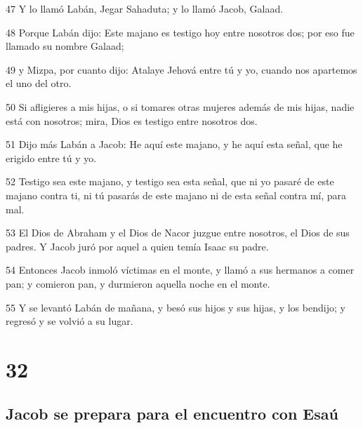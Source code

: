 \par 47 Y lo llamó Labán, Jegar Sahaduta; y lo llamó Jacob, Galaad.
\par 48 Porque Labán dijo: Este majano es testigo hoy entre nosotros dos; por eso fue llamado su nombre Galaad;
\par 49 y Mizpa, por cuanto dijo: Atalaye Jehová entre tú y yo, cuando nos apartemos el uno del otro.
\par 50 Si afligieres a mis hijas, o si tomares otras mujeres además de mis hijas, nadie está con nosotros; mira, Dios es testigo entre nosotros dos.
\par 51 Dijo más Labán a Jacob: He aquí este majano, y he aquí esta señal, que he erigido entre tú y yo.
\par 52 Testigo sea este majano, y testigo sea esta señal, que ni yo pasaré de este majano contra ti, ni tú pasarás de este majano ni de esta señal contra mí, para mal.
\par 53 El Dios de Abraham y el Dios de Nacor juzgue entre nosotros, el Dios de sus padres. Y Jacob juró por aquel a quien temía Isaac su padre.
\par 54 Entonces Jacob inmoló víctimas en el monte, y llamó a sus hermanos a comer pan; y comieron pan, y durmieron aquella noche en el monte.
\par 55 Y se levantó Labán de mañana, y besó sus hijos y sus hijas, y los bendijo; y regresó y se volvió a su lugar.

\chapter{32}

\section*{Jacob se prepara para el encuentro con Esaú}

